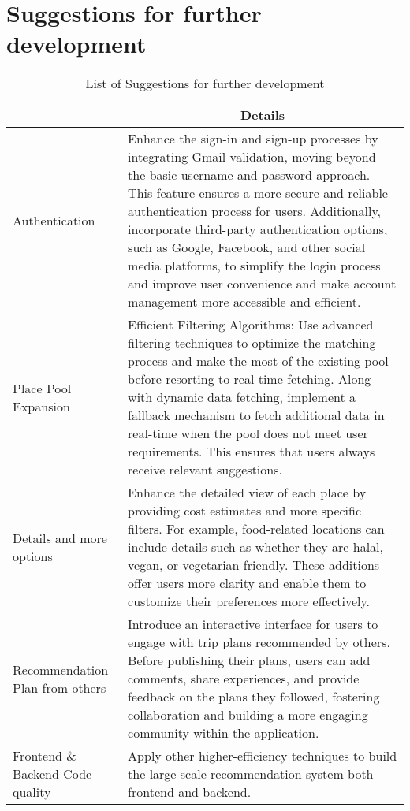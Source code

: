 \section{Suggestions for further development}
\newpage
\begin{table}[]
    \centering
    \renewcommand{\arraystretch}{1.2}
    \begin{tabular}{|p{2.2in}|p{4in}|}
    \hline
    \rowcolor[HTML]{C0C0C0} 
    \multicolumn{1}{|c|}{\cellcolor[HTML]{C0C0C0}\textbf{Suggestion}}                                                                                       & \multicolumn{1}{c|}{\cellcolor[HTML]{C0C0C0}\textbf{Details}}   \\ \hline
    Authentication & Enhance the sign-in and sign-up processes by integrating Gmail validation, moving beyond the basic username and password approach. This feature ensures a more secure and reliable authentication process for users. Additionally, incorporate third-party authentication options, such as Google, Facebook, and other social media platforms, to simplify the login process and improve user convenience and make account management more accessible and efficient. \\ \hline
    Place Pool Expansion & Efficient Filtering Algorithms: Use advanced filtering techniques to optimize the matching process and make the most of the existing pool before resorting to real-time fetching. Along with dynamic data fetching, implement a fallback mechanism to fetch additional data in real-time when the pool does not meet user requirements. This ensures that users always receive relevant suggestions. \\ \hline
    Details and more options & Enhance the detailed view of each place by providing cost estimates and more specific filters. For example, food-related locations can include details such as whether they are halal, vegan, or vegetarian-friendly. These additions offer users more clarity and enable them to customize their preferences more effectively. \\ \hline
    Recommendation Plan from others & Introduce an interactive interface for users to engage with trip plans recommended by others. Before publishing their plans, users can add comments, share experiences, and provide feedback on the plans they followed, fostering collaboration and building a more engaging community within the application. \\ \hline
    Frontend \& Backend Code quality & Apply other higher-efficiency techniques to build the large-scale recommendation system both frontend and backend. \\ \hline
    \end{tabular}
    \caption{List of Suggestions for further development}
    \label{tab:suggestion-table}
\end{table}

